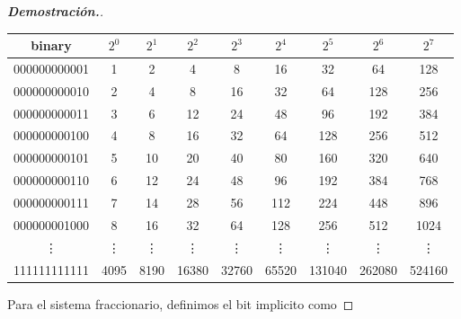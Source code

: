 \documentclass{article}
\begin{document}
\begin{enumerate}
\begin{mdframed}[
			      linecolor=darkgray,
			      backgroundcolor=white]
\begin{proof}[\textbf{Demostraci\'on.}]
			      \begin{center}
				      \begin{tabular}{c|cccccccc}
					      \textbf{binary} & $2^{0}$ & $2^{1}$ & $2^{2}$ & $2^{3}$ & $2^{4}$ & $2^{5}$ & $2^{6}$ & $2^{7}$ \\ \hline
					      000000000001    & 1       & 2       & 4       & 8       & 16      & 32      & 64      & 128     \\
					      000000000010    & 2       & 4       & 8       & 16      & 32      & 64      & 128     & 256     \\
					      000000000011    & 3       & 6       & 12      & 24      & 48      & 96      & 192     & 384     \\
					      000000000100    & 4       & 8       & 16      & 32      & 64      & 128     & 256     & 512     \\
					      000000000101    & 5       & 10      & 20      & 40      & 80      & 160     & 320     & 640     \\
					      000000000110    & 6       & 12      & 24      & 48      & 96      & 192     & 384     & 768     \\
					      000000000111    & 7       & 14      & 28      & 56      & 112     & 224     & 448     & 896     \\
					      000000001000    & 8       & 16      & 32      & 64      & 128     & 256     & 512     & 1024    \\
					      \vdots          & \vdots  & \vdots  & \vdots  & \vdots  & \vdots  & \vdots  & \vdots  & \vdots  \\
					      111111111111    & 4095    & 8190    & 16380   & 32760   & 65520   & 131040  & 262080  & 524160
				      \end{tabular}
			      \end{center}

			      Para el sistema fraccionario, definimos el bit implicito como


\end{proof}
\end{mdframed}
\end{enumerate}
\end{document}

